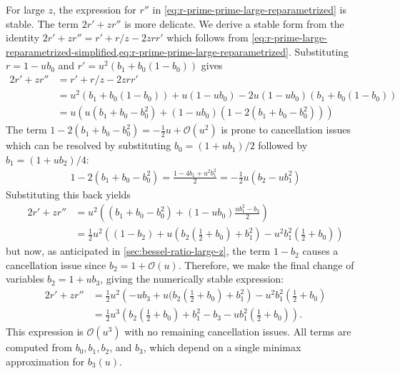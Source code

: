 \documentclass{article}
\begin{document}
For large $z$, the expression for $r''$ in \cref{eq:r-prime-prime-large-reparametrized} is stable.
The term $2r'+zr''$ is more delicate.
We derive a stable form from the identity $2r' + zr'' = r' + r/z - 2zrr'$ which follows from \cref{eq:r-prime-large-reparametrized-simplified,eq:r-prime-prime-large-reparametrized}.
Substituting $r=1-ub_0$ and $r'=u^2(b_1+b_0(1-b_0))$ gives
%
\begin{align}
  2r' + zr'' & = r' + r/z - 2zrr'                                              \\
             & = u^2 (b_1+b_0(1-b_0)) + u(1-ub_0) - 2u(1-ub_0)(b_1+b_0(1-b_0)) \\
             & = u ( u(b_1+b_0-b_0^2) + (1-ub_0)(1 - 2(b_1+b_0-b_0^2)) )
\end{align}
%
The term $1-2(b_1+b_0-b_0^2) = -\frac{1}{2}u + \mathcal{O}(u^2)$ is prone to cancellation issues which can be resolved by substituting $b_0=(1+ub_1)/2$ followed by $b_1=(1+ub_2)/4$:
%
\begin{align}
  1-2(b_1+b_0-b_0^2) = \frac{1-4b_1+u^2 b_1^2}{2} = -\frac{1}{2}u(b_2 - u b_1^2)
\end{align}
%
Substituting this back yields
%
\begin{align}
  2r' + zr'' & = u^2 \left( (b_1+b_0-b_0^2) + (1-ub_0)\frac{u b_1^2 - b_2}{2} \right)                                          \\
             & = \frac{1}{2} u^2 \left( (1-b_2) + u (b_2 (\frac{1}{2}+b_0 ) + b_1^2 ) - u^2 b_1^2 (\frac{1}{2} + b_0 ) \right)
\end{align}
%
but now, as anticipated in \cref{sec:bessel-ratio-large-z}, the term $1-b_2$ causes a cancellation issue since $b_2 = 1 + \mathcal{O}(u)$.
Therefore, we make the final change of variables $b_2 = 1 + u b_3$, giving the numerically stable expression:
%
\begin{align}
  2r' + zr'' & = \frac{1}{2} u^2 \left( -u b_3 + u (b_2 (\frac{1}{2}+b_0 ) + b_1^2 \right) - u^2 b_1^2 ( \frac{1}{2} + b_0 )                                     \\
             & = \frac{1}{2} u^3 \left( b_2 (\frac{1}{2}+b_0 ) + b_1^2 - b_3 - u b_1^2 (\frac{1}{2} + b_0) \right). \label{eq:two-rprime-z-r-primeprime-large-z}
\end{align}
%
This expression is $\mathcal{O}(u^3)$ with no remaining cancellation issues.
All terms are computed from $b_0, b_1, b_2$, and $b_3$, which depend on a single minimax approximation for $b_3(u)$.
\end{document}
